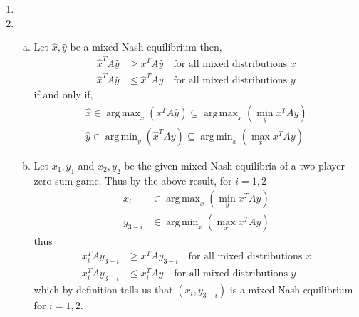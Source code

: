 \documentclass[a4paper,12pt]{article}
\theoremstyle{definition}
\DeclareMathOperator*{\argmax}{arg\,max}
\DeclareMathOperator*{\argmin}{arg\,min}
\begin{document}
\begin{enumerate}
\item
\item 
\begin{enumerate}[(a)]
\item %
Let $\hat{x}, \hat{y}$ be a mixed Nash equilibrium then,
\begin{align}
\hat{x}^TA\hat{y}&\geq x^TA\hat{y} \quad \text{for all mixed distributions $x$}\\
\hat{x}^TA\hat{y}&\leq \hat{x}^TAy \quad \text{for all mixed distributions $y$}
\end{align}
if and only if,
\begin{align*}
\hat{x}\in\argmax_x \left(x^TA \hat{y}\right)\subseteq\argmax_x\left(\min_yx^TAy\right)\\
\hat{y}\in\argmin_y \left(\hat{x}^T Ay\right)\subseteq\argmin_x\left(\max_xx^TAy\right)
\end{align*}

\item Let $x_1,y_1$ and $x_2,y_2$ be the given mixed Nash equilibria of a two-player zero-sum game. Thus by the above result, for $i=1,2$
\begin{align*}
x_i &\in \argmax_x\left(\min_yx^TAy\right)\\
y_{3-i} & \in\argmin_x\left(\max_xx^TAy\right)
\end{align*}
thus
\begin{align*}
x_i^TAy_{3-i}&\geq x^TAy_{3-i} \quad \text{for all mixed distributions $x$}\\
x_i^TAy_{3-i}&\leq x_i^TAy_{} \quad \text{for all mixed distributions $y$}
\end{align*}
which by definition tells us that $(x_i,y_{3-i})$ is a mixed Nash equilibrium for $i=1,2$.
\end{enumerate}


\end{enumerate}
\end{document}
